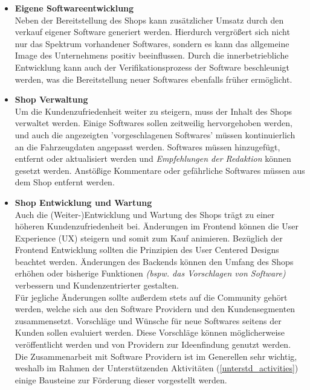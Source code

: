 \begin{itemize}
	\item[] \hspace{-0.6cm} \textbf{Eigene Softwareentwicklung}\\
	Neben der Bereitstellung des Shops kann zusätzlicher Umsatz durch den verkauf eigener Software generiert werden. Hierdurch vergrößert sich nicht nur das Spektrum vorhandener Softwares, sondern es kann das allgemeine Image des Unternehmens positiv beeinflussen. Durch die innerbetriebliche Entwicklung kann auch der Verifikationsprozess der Software beschleunigt werden, was die Bereitstellung neuer Softwares ebenfalls früher ermöglicht.

	\item[] \hspace{-0.6cm}\textbf{Shop Verwaltung}\\
	Um die Kundenzufriedenheit weiter zu steigern, muss der Inhalt des Shops verwaltet werden. Einige Softwares sollen zeitweilig hervorgehoben werden, und auch die angezeigten 'vorgeschlagenen Softwares' müssen kontinuierlich an die Fahrzeugdaten angepasst werden.
	Softwares müssen hinzugefügt, entfernt oder aktualisiert werden und \textit{Empfehlungen der Redaktion} können gesetzt werden. Anstößige Kommentare oder gefährliche Softwares müssen aus dem Shop entfernt werden.

	\item[] \hspace{-0.6cm} \textbf{Shop Entwicklung und Wartung}\\
	Auch die (Weiter-)Entwicklung und Wartung des Shops trägt zu einer höheren Kundenzufriedenheit bei. Änderungen im Frontend können die User Experience (UX) steigern und somit zum Kauf animieren. Bezüglich der Frontend Entwicklung sollten die Prinzipien des User Centered Designs beachtet werden. Änderungen des Backends können den Umfang des Shops erhöhen oder bisherige Funktionen \textit{(bspw. das Vorschlagen von Software)} verbessern und Kundenzentrierter gestalten.\\
	Für jegliche Änderungen sollte außerdem stets auf die Community gehört werden, welche sich aus den Software Providern und den Kundensegmenten zusammensetzt. Vorschläge und Wünsche für neue Softwares seitens der Kunden sollen evaluiert werden. Diese Vorschläge können möglicherweise veröffentlicht werden und von Providern  zur Ideenfindung genutzt werden. Die Zusammenarbeit mit Software Providern ist im Generellen sehr wichtig, weshalb im Rahmen der Unterstützenden Aktivitäten (\ref{unterstd_activities}) einige Bausteine zur Förderung dieser vorgestellt werden.	\\
\end{itemize}
